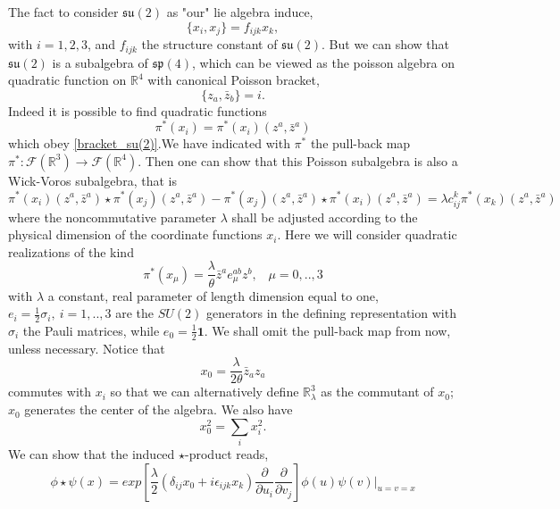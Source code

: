\documentclass[a4paper,11pt]{article} %
\numberwithin{equation}{section} %
\numberwithin{figure}{section} %
\theoremstyle{plain} %
\theoremstyle{definition} %
\theoremstyle{remark} %
\begin{document}
\noindent
The fact to consider $\mathfrak{su}(2)$ as "our" lie algebra induce,
\begin{equation}
 \{ x_i , x_j \} = f_{ijk} x_k, \label{bracket_su(2)}
\end{equation}
with $i=1, 2, 3$, and $f_{ijk}$ the structure constant of $\mathfrak{su}(2)$. But we can show that $\mathfrak{su}(2)$ is a subalgebra of $\mathfrak{sp}(4)$, which can be viewed as the poisson algebra on quadratic function on $\mathbb{R}^4$ with canonical Poisson bracket,
\begin{equation*}
 \{ z_a , \bar{z}_b \} = i.
\end{equation*}
Indeed it is possible to find quadratic functions
\begin{equation*}
 \pi^*(x_i)= \pi^*(x_i)(z^a,\bar z^a)
\end{equation*}
which obey \ref{bracket_su(2)}.We have indicated with $\pi^*$ the  pull-back map $\pi^*:\mathcal{F}(\mathbb{R}^3)\rightarrow \mathcal{F}(\mathbb{R}^4)$. Then one can show  that this Poisson subalgebra is also a Wick-Voros  subalgebra, that is
\begin{equation*}
 \pi^*(x_i)(z^a,\bar z^a)\star \pi^*(x_j)(z^a,\bar z^a) -\pi^*(x_j)(z^a,\bar z^a)\star \pi^*(x_i)(z^a,\bar
z^a)= \lambda c_{ij}^k \pi^*(x_k)(z^a,\bar z^a)
\end{equation*}
where the noncommutative parameter $\lambda$  shall be adjusted according to  the physical dimension of the coordinate functions $x_i$. Here we will consider quadratic realizations of the kind
\begin{equation*}
 \pi^*(x_\mu)=\frac{\lambda}{\theta} \bar z^a e_\mu^{ab} z^b, \;\;\; \mu=0, ..,3 \label{xmu}
\end{equation*}
with $\lambda$ a constant, real parameter of length dimension equal to one, $e_i= \frac{1}{2}\sigma_i, \: i=1,..,3$ are the $SU(2)$ generators in the defining representation with  $\sigma_i$
the Pauli matrices, while $e_0=\frac{1}{2} \mathbf{1}$.  We  shall omit the pull-back map from now, unless necessary. Notice that
\begin{equation*}
x_0=\frac{\lambda}{2\theta}\bar z_a z_a
\end{equation*}
commutes with $x_i$ so that we can alternatively define $\mathbb{R}^3_\lambda$ as the commutant of $x_0$; $x_0$ generates the center of the algebra. We also have
\begin{equation*}
 x_0^2= \sum_i x_i^2.
\end{equation*}
We can show that the induced $\star$-product reads,
\begin{equation*}
 \phi \star \psi (x) = exp \left[ \frac{\lambda}{2} ( \delta_{ij} x_0 + i \epsilon_{ijk} x_k ) \frac{\partial}{\partial u_i} \frac{\partial}{\partial v_j} \right] \phi(u) \psi(v) |_{u=v=x}
\end{equation*}
\end{document}

